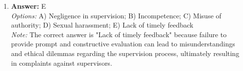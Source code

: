 \documentclass[12pt]{article}
\begin{document}
\begin{enumerate}[label=\arabic*.]
\\ \textit{Options:} A) Childhood experiences; B) Astrological signs and birth months; C) Educational background and intelligence quotient (IQ); D) Exercise frequency and body mass index (BMI); E) Use of technology and media consumption
\\ \textit{Note:} Psychologists generally accept that childhood experiences, including trauma and adverse events, significantly influence the development of functional psychoses by shaping an individual's psychological resilience and coping mechanisms.
\item \textbf{Answer:} E
\\ \textit{Options:} A) Negligence in supervision; B) Incompetence; C) Misuse of authority; D) Sexual harassment; E) Lack of timely feedback
\\ \textit{Note:} The correct answer is "Lack of timely feedback" because failure to provide prompt and constructive evaluation can lead to misunderstandings and ethical dilemmas regarding the supervision process, ultimately resulting in complaints against supervisors.
\end{enumerate}
\end{document}
